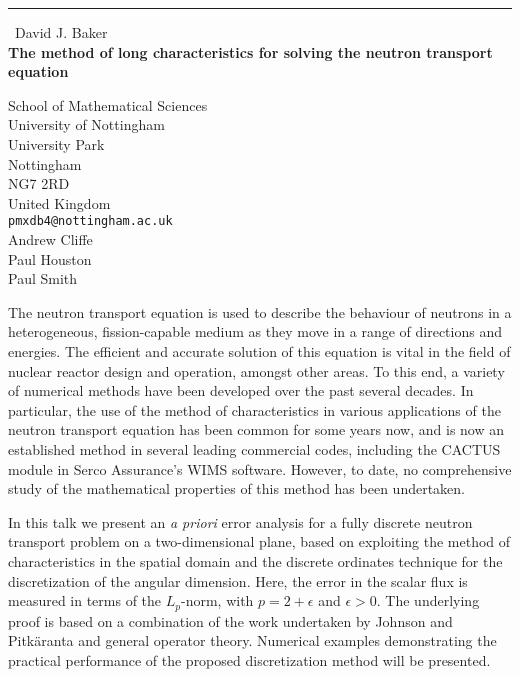 \documentclass{report}
\begin{document}
\begin{center}
\rule{6in}{1pt} \
{\large David J. Baker \\
{\bf The method of long characteristics for solving the neutron transport equation}}

School of Mathematical Sciences \\ University of Nottingham \\ University Park \\ Nottingham \\ NG7 2RD \\ United Kingdom
\\
{\tt pmxdb4@nottingham.ac.uk}\\
Andrew Cliffe\\
Paul Houston\\
Paul Smith\end{center}

The neutron transport equation is used to describe the behaviour of
neutrons in a heterogeneous, fission-capable medium as they move in a
range of directions and energies. The efficient and accurate solution of
this equation is vital in the field of nuclear reactor design and
operation, amongst other areas. To this end, a variety of numerical
methods have been developed over the past several decades. In particular,
the use of the method of characteristics in various applications of the
neutron transport equation has been common for some years now, and is now
an established method in several leading commercial codes, including the
CACTUS module in Serco Assurance's WIMS software. However, to date, no
comprehensive study of the mathematical properties of this method has
been undertaken.

In this talk we present an \emph{a priori} error analysis for a fully
discrete neutron transport problem on a two-dimensional plane, based on
exploiting the method of characteristics in the spatial domain and the
discrete ordinates technique for the discretization of the angular
dimension. Here, the error in the scalar flux is measured in terms of the
$L_{p}$-norm, with $p = 2+\epsilon$ and $\epsilon>0$. The underlying
proof is based on a combination of the work undertaken by Johnson and
Pitk{\"a}ranta and general operator theory. Numerical examples
demonstrating the practical performance of the proposed discretization
method will be presented.
\end{document}
